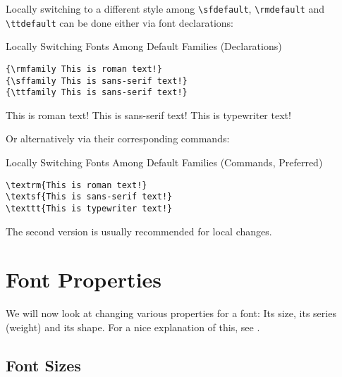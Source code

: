 \documentclass[a4paper,oneside,11pt]{article}
\newcommand\comm[1]{\texttt{\textbackslash#1}}
\begin{document}
Locally   switching    to   a   different   style    among   \comm{sfdefault},
\comm{rmdefault}   and  \comm{ttdefault}   can   be  done   either  via   font
declarations:

\begin{titled-frame}
{\textsf{Locally Switching Fonts Among Default Families (Declarations)}}
\vspace{-1em}
\begin{verbatim}
{\rmfamily This is roman text!}
{\sffamily This is sans-serif text!}
{\ttfamily This is sans-serif text!}
\end{verbatim}
{\rmfamily This is roman text!}
{\sffamily This is sans-serif text!}
{\ttfamily This is typewriter text!}
\end{titled-frame}

Or alternatively via their corresponding commands:

\begin{titled-frame}
{\textsf{Locally Switching Fonts Among Default Families (Commands, Preferred)}}
\vspace{-1em}
\begin{verbatim}
\textrm{This is roman text!}
\textsf{This is sans-serif text!}
\texttt{This is typewriter text!}
\end{verbatim}
\vspace{-1em}
\end{titled-frame}

The second version is usually recommended for local changes.


\newpage
\section{Font Properties}
\label{sec:font-props}

We  will  now look  at  changing  various  properties  for a  font: Its  size,
its  series (weight)  and  its  shape. For a  nice  explanation  of this,  see
\cite{stackexch:bfseries-textbf}.


\subsection{Font Sizes}
\label{subsec:font-sizes}
\end{document}
